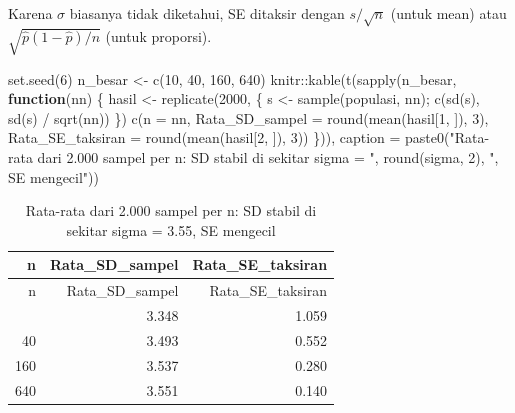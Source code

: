 \documentclass[
  indonesian,
  letterpaper,
]{book}
\newenvironment{Shaded}{\begin{snugshade}}{\end{snugshade}}
\newcommand{\AttributeTok}[1]{\textcolor[rgb]{0.40,0.45,0.13}{#1}}
\newcommand{\ControlFlowTok}[1]{\textcolor[rgb]{0.00,0.23,0.31}{\textbf{#1}}}
\newcommand{\DecValTok}[1]{\textcolor[rgb]{0.68,0.00,0.00}{#1}}
\newcommand{\FunctionTok}[1]{\textcolor[rgb]{0.28,0.35,0.67}{#1}}
\newcommand{\NormalTok}[1]{\textcolor[rgb]{0.00,0.23,0.31}{#1}}
\newcommand{\OtherTok}[1]{\textcolor[rgb]{0.00,0.23,0.31}{#1}}
\newcommand{\SpecialCharTok}[1]{\textcolor[rgb]{0.37,0.37,0.37}{#1}}
\newcommand{\StringTok}[1]{\textcolor[rgb]{0.13,0.47,0.30}{#1}}
\begin{document}
Karena \(\sigma\) biasanya tidak diketahui, SE ditaksir dengan
\(s/\sqrt{n}\) (untuk mean) atau \(\sqrt{\hat{p}(1-\hat{p})/n}\) (untuk
proporsi).

\begin{Shaded}
\begin{Highlighting}[]
\FunctionTok{set.seed}\NormalTok{(}\DecValTok{6}\NormalTok{)}
\NormalTok{n\_besar }\OtherTok{\textless{}{-}} \FunctionTok{c}\NormalTok{(}\DecValTok{10}\NormalTok{, }\DecValTok{40}\NormalTok{, }\DecValTok{160}\NormalTok{, }\DecValTok{640}\NormalTok{)}
\NormalTok{knitr}\SpecialCharTok{::}\FunctionTok{kable}\NormalTok{(}\FunctionTok{t}\NormalTok{(}\FunctionTok{sapply}\NormalTok{(n\_besar, }\ControlFlowTok{function}\NormalTok{(nn) \{}
\NormalTok{  hasil }\OtherTok{\textless{}{-}} \FunctionTok{replicate}\NormalTok{(}\DecValTok{2000}\NormalTok{, \{ s }\OtherTok{\textless{}{-}} \FunctionTok{sample}\NormalTok{(populasi, nn); }\FunctionTok{c}\NormalTok{(}\FunctionTok{sd}\NormalTok{(s), }\FunctionTok{sd}\NormalTok{(s) }\SpecialCharTok{/} \FunctionTok{sqrt}\NormalTok{(nn)) \})}
  \FunctionTok{c}\NormalTok{(}\AttributeTok{n =}\NormalTok{ nn, }\AttributeTok{Rata\_SD\_sampel =} \FunctionTok{round}\NormalTok{(}\FunctionTok{mean}\NormalTok{(hasil[}\DecValTok{1}\NormalTok{, ]), }\DecValTok{3}\NormalTok{),}
    \AttributeTok{Rata\_SE\_taksiran =} \FunctionTok{round}\NormalTok{(}\FunctionTok{mean}\NormalTok{(hasil[}\DecValTok{2}\NormalTok{, ]), }\DecValTok{3}\NormalTok{))}
\NormalTok{\})), }\AttributeTok{caption =} \FunctionTok{paste0}\NormalTok{(}\StringTok{"Rata{-}rata dari 2.000 sampel per n: SD stabil di sekitar sigma = "}\NormalTok{,}
                      \FunctionTok{round}\NormalTok{(sigma, }\DecValTok{2}\NormalTok{), }\StringTok{", SE mengecil"}\NormalTok{))}
\end{Highlighting}
\end{Shaded}

\begin{longtable}[]{@{}rrr@{}}
\caption{Rata-rata dari 2.000 sampel per n: SD stabil di sekitar sigma =
3.55, SE mengecil}\tabularnewline
\toprule\noalign{}
n & Rata\_SD\_sampel & Rata\_SE\_taksiran \\
\midrule\noalign{}
\endfirsthead
\toprule\noalign{}
n & Rata\_SD\_sampel & Rata\_SE\_taksiran \\
\midrule\noalign{}
\endhead
\bottomrule\noalign{}
\endlastfoot
10 & 3.348 & 1.059 \\
40 & 3.493 & 0.552 \\
160 & 3.537 & 0.280 \\
640 & 3.551 & 0.140 \\
\end{longtable}
\end{document}
